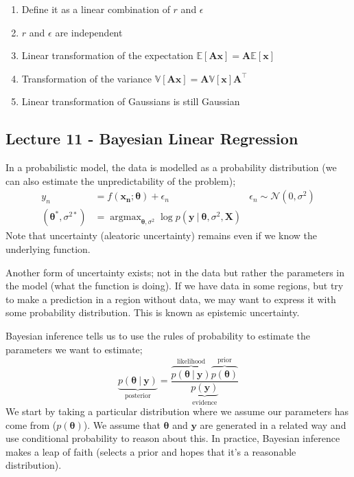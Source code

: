 \documentclass[a4paper, 12pt]{article}
\newcommand{\mat}[1]{\boldsymbol{#1}}
\renewcommand{\vec}[1]{\boldsymbol{#1}}
\DeclareMathOperator*{\argmax}{argmax}
\begin{document}
                \begin{enumerate}[(1)]
                    \itemsep0em
                    \setcounter{enumi}{4}
                    \item Define it as a linear combination of $r$ and $\epsilon$
                    \item $r$ and $\epsilon$ are independent
                    \item Linear transformation of the expectation $\mathbb{E}[\mat{A}\vec{x}] = \mat{A}\mathbb{E}[\vec{x}]$
                    \setcounter{enumi}{8}
                    \item Transformation of the variance $\mathbb{V}[\mat{A}\vec{x}] = \mat{A}\mathbb{V}[\vec{x}]\mat{A}^\top$
                    \setcounter{enumi}{10}
                    \item Linear transformation of Gaussians is still Gaussian
                \end{enumerate}
        \subsection*{Lecture 11 - Bayesian Linear Regression}
            In a probabilistic model, the data is modelled as a probability distribution (we can also estimate the unpredictability of the problem);
            \begin{align*}
                y_n & = f(\vec{x_n}; \vec{\theta}) + \epsilon_n & \epsilon_n \sim \mathcal{N}(0, \sigma^2) \\
                (\vec{\theta^*}, \sigma^{2*}) & = \argmax_{\vec{\theta}, \sigma^2} \log p(\vec{y}\ |\ \vec{\theta}, \sigma^2, \mat{X})
            \end{align*}
            Note that uncertainty (aleatoric uncertainty) remains even if we know the underlying function.
            \medskip

            Another form of uncertainty exists; not in the data but rather the parameters in the model (what the function is doing).
            If we have data in some regions, but try to make a prediction in a region without data, we may want to express it with some probability distribution.
            This is known as epistemic uncertainty.
            \medskip

            Bayesian inference tells us to use the rules of probability to estimate the parameters we want to estimate;
            $$\underbrace{p(\vec{\theta}\ |\ \vec{y})}_\text{posterior} = \frac{\overbrace{p(\vec{\theta}\ |\ \vec{y})}^\text{likelihood}\overbrace{p(\vec{\theta})}^\text{prior}}{\underbrace{p(\vec{y})}_\text{evidence}}$$
            We start by taking a particular distribution where we assume our parameters has come from ($p(\vec{\theta})$).
            We assume that $\vec{\theta}$ and $\vec{y}$ are generated in a related way and use conditional probability to reason about this.
            In practice, Bayesian inference makes a leap of faith (selects a prior and hopes that it's a reasonable distribution).
            \medskip
\end{document}
